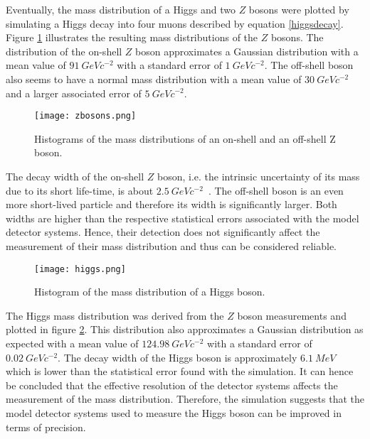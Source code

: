\documentclass{article}
\begin{document}
\pagebreak

Eventually, the mass distribution of a Higgs and two $Z$ bosons were plotted by simulating a Higgs decay into four muons described by equation \ref{higgsdecay}.\\

Figure \ref{zbosons} illustrates the resulting mass distributions of the $Z$ bosons. The distribution of the on-shell $Z$ boson approximates a Gaussian distribution with a mean value of $91\ GeVc^{-2}$ with a standard error of $1\ GeVc^{-2}$. The off-shell boson also seems to have a normal mass distribution with a mean value of $30\ GeVc^{-2}$ and a larger associated error of $5\ GeVc^{-2}$.\\

\begin{figure}[h]
\centering
\texttt{[image: zbosons.png]}
\caption{Histograms of the mass distributions of an on-shell and an off-shell Z boson.}
	\label{zbosons}
\end{figure}

The decay width of the on-shell $Z$ boson, i.e. the intrinsic uncertainty of its mass due to its short life-time, is about $2.5\ GeVc^{-2}$~\cite{zbosonwidth}. The off-shell boson is an even more short-lived particle and therefore its width is significantly larger. Both widths are higher than the respective statistical errors associated with the model detector systems. Hence, their detection does not significantly affect the measurement of their mass distribution and thus can be considered reliable.\\

\begin{figure}[h]
\centering
\texttt{[image: higgs.png]}
\caption{Histogram of the mass distribution of a Higgs boson.}
	\label{higgs}
\end{figure}

The Higgs mass distribution was derived from the $Z$ boson measurements and plotted in figure \ref{higgs}. This distribution also approximates a Gaussian distribution as expected with a mean value of $124.98\ GeVc^{-2}$ with a standard error of $0.02\ GeVc^{-2}$. The decay width of the Higgs boson is approximately $6.1\ MeV$~\cite{higgswidth} which is lower than the statistical error found with the simulation. It can hence be concluded that the effective resolution of the detector systems affects the measurement of the mass distribution. Therefore, the simulation suggests that the model detector systems used to measure the Higgs boson can be improved in terms of precision.\\
\end{document}
